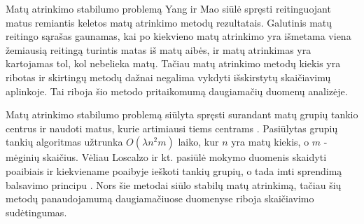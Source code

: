 



Matų atrinkimo stabilumo problemą Yang ir Mao \cite{yang2011robust} siūlė spręsti reitinguojant matus remiantis keletos matų atrinkimo metodų rezultatais. Galutinis matų reitingo sąrašas gaunamas, kai po kiekvieno matų atrinkimo yra išmetama viena žemiausią reitingą turintis matas iš matų aibės, ir matų atrinkimas yra kartojamas tol, kol nebelieka matų. Tačiau matų atrinkimo metodų kiekis yra ribotas ir skirtingų metodų dažnai negalima vykdyti išskirstytų skaičiavimų aplinkoje. Tai riboja šio metodo pritaikomumą daugiamačių duomenų analizėje.

Matų atrinkimo stabilumo problemą siūlyta spręsti surandant matų grupių tankio centrus ir naudoti matus, kurie artimiausi tiems centrams \cite{yu2008stable}. Pasiūlytas grupių tankių algoritmas užtrunka $O(\lambda n^2m)$ laiko, kur $n$ yra matų kiekis, o $m$ - mėginių skaičius. Vėliau Loscalzo ir kt. pasiūlė mokymo duomenis skaidyti poaibiais ir kiekviename poaibyje ieškoti tankių grupių, o tada imti sprendimą balsavimo principu \cite{loscalzo2009consensus}. Nors šie metodai siūlo stabilų matų atrinkimą, tačiau šių metodų panaudojamumą daugiamačiuose duomenyse riboja skaičiavimo sudėtingumas.

